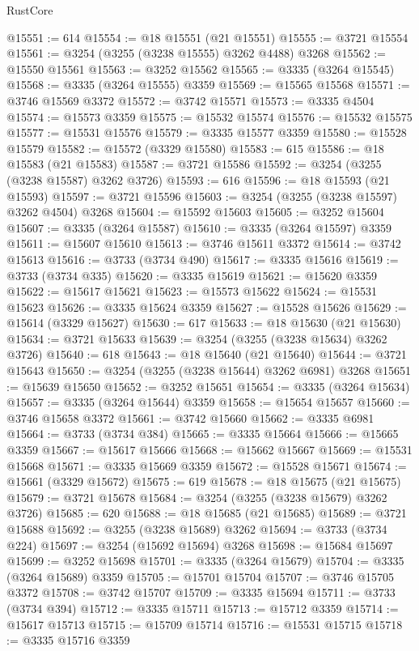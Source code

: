 \begin{lexlean}{RustCore}
\begin{coremodule}
@15551 := 614
@15554 := @18 @15551 (@21 @15551)
@15555 := @3721 @15554
@15561 := @3254 (@3255 (@3238 @15555) @3262 @4488) @3268
@15562 := @15550 @15561
@15563 := @3252 @15562
@15565 := @3335 (@3264 @15545)
@15568 := @3335 (@3264 @15555) @3359
@15569 := @15565 @15568
@15571 := @3746 @15569 @3372
@15572 := @3742 @15571
@15573 := @3335 @4504
@15574 := @15573 @3359
@15575 := @15532 @15574
@15576 := @15532 @15575
@15577 := @15531 @15576
@15579 := @3335 @15577 @3359
@15580 := @15528 @15579
@15582 := @15572 (@3329 @15580)
@15583 := 615
@15586 := @18 @15583 (@21 @15583)
@15587 := @3721 @15586
@15592 := @3254 (@3255 (@3238 @15587) @3262 @3726)
@15593 := 616
@15596 := @18 @15593 (@21 @15593)
@15597 := @3721 @15596
@15603 := @3254 (@3255 (@3238 @15597) @3262 @4504) @3268
@15604 := @15592 @15603
@15605 := @3252 @15604
@15607 := @3335 (@3264 @15587)
@15610 := @3335 (@3264 @15597) @3359
@15611 := @15607 @15610
@15613 := @3746 @15611 @3372
@15614 := @3742 @15613
@15616 := @3733 (@3734 @490)
@15617 := @3335 @15616
@15619 := @3733 (@3734 @335)
@15620 := @3335 @15619
@15621 := @15620 @3359
@15622 := @15617 @15621
@15623 := @15573 @15622
@15624 := @15531 @15623
@15626 := @3335 @15624 @3359
@15627 := @15528 @15626
@15629 := @15614 (@3329 @15627)
@15630 := 617
@15633 := @18 @15630 (@21 @15630)
@15634 := @3721 @15633
@15639 := @3254 (@3255 (@3238 @15634) @3262 @3726)
@15640 := 618
@15643 := @18 @15640 (@21 @15640)
@15644 := @3721 @15643
@15650 := @3254 (@3255 (@3238 @15644) @3262 @6981) @3268
@15651 := @15639 @15650
@15652 := @3252 @15651
@15654 := @3335 (@3264 @15634)
@15657 := @3335 (@3264 @15644) @3359
@15658 := @15654 @15657
@15660 := @3746 @15658 @3372
@15661 := @3742 @15660
@15662 := @3335 @6981
@15664 := @3733 (@3734 @384)
@15665 := @3335 @15664
@15666 := @15665 @3359
@15667 := @15617 @15666
@15668 := @15662 @15667
@15669 := @15531 @15668
@15671 := @3335 @15669 @3359
@15672 := @15528 @15671
@15674 := @15661 (@3329 @15672)
@15675 := 619
@15678 := @18 @15675 (@21 @15675)
@15679 := @3721 @15678
@15684 := @3254 (@3255 (@3238 @15679) @3262 @3726)
@15685 := 620
@15688 := @18 @15685 (@21 @15685)
@15689 := @3721 @15688
@15692 := @3255 (@3238 @15689) @3262
@15694 := @3733 (@3734 @224)
@15697 := @3254 (@15692 @15694) @3268
@15698 := @15684 @15697
@15699 := @3252 @15698
@15701 := @3335 (@3264 @15679)
@15704 := @3335 (@3264 @15689) @3359
@15705 := @15701 @15704
@15707 := @3746 @15705 @3372
@15708 := @3742 @15707
@15709 := @3335 @15694
@15711 := @3733 (@3734 @394)
@15712 := @3335 @15711
@15713 := @15712 @3359
@15714 := @15617 @15713
@15715 := @15709 @15714
@15716 := @15531 @15715
@15718 := @3335 @15716 @3359

\end{coremodule}
\end{lexlean}
